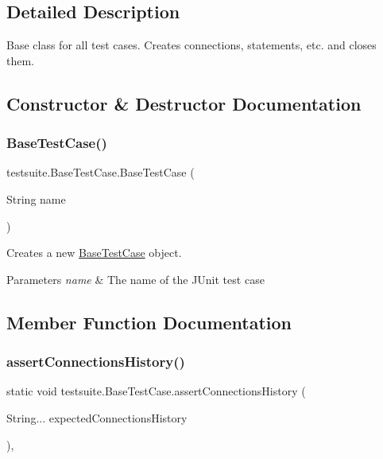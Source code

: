 \subsection{Detailed Description}
Base class for all test cases. Creates connections, statements, etc. and closes them. 

\subsection{Constructor \& Destructor Documentation}
\mbox{\label{classtestsuite_1_1_base_test_case_a353e63229f72905eb043169b6c2002b5}} 
\subsubsection{\texorpdfstring{Base\+Test\+Case()}{BaseTestCase()}}
{\footnotesize\ttfamily testsuite.\+Base\+Test\+Case.\+Base\+Test\+Case (\begin{DoxyParamCaption}\item[{String}]{name }\end{DoxyParamCaption})}

Creates a new \mbox{\hyperlink{classtestsuite_1_1_base_test_case}{Base\+Test\+Case}} object.


\begin{DoxyParams}{Parameters}
{\em name} & The name of the J\+Unit test case \\
\hline
\end{DoxyParams}


\subsection{Member Function Documentation}
\mbox{\label{classtestsuite_1_1_base_test_case_aca5533ef294301b97ad9d54a7edf825f}} 
\subsubsection{\texorpdfstring{assert\+Connections\+History()}{assertConnectionsHistory()}}
{\footnotesize\ttfamily static void testsuite.\+Base\+Test\+Case.\+assert\+Connections\+History (\begin{DoxyParamCaption}\item[{String...}]{expected\+Connections\+History }\end{DoxyParamCaption})\hspace{0.3cm}{\ttfamily [static]}, {\ttfamily [protected]}}

